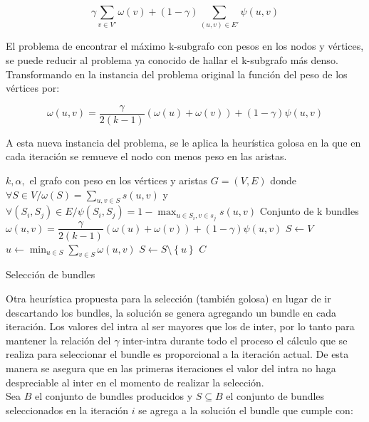 \begin{equation}
\gamma \sum_{v \in V'}{\omega(v)} + (1 - \gamma) \sum_{(u,v) \in E'}{\psi(u,v)}
\end{equation}

El problema de encontrar el máximo k-subgrafo con pesos en los nodos y vértices, se puede reducir al problema ya conocido de hallar el k-subgrafo más denso\cite{SubgraphProblem}. Transformando en la instancia del problema original la función del peso de los vértices por:
 
\begin{equation}
\omega(u,v) = \dfrac{\gamma}{2( k - 1)} (\omega(u) + \omega(v)) + (1 - \gamma)\psi(u,v) 
\end{equation}

A esta nueva instancia del problema, se le aplica la heurística golosa en la que en cada iteración se remueve el nodo con menos peso en las aristas.\\

\begin{algorithm}[H]
\begin{algorithmic}[1]
\REQUIRE $k, \alpha,$ el grafo con peso en los vértices y aristas  $G=(V,E)$ donde $\forall S \in V / \omega(S) = \sum_{u,v \in S}{s(u,v)}$ y $\forall (S_i,S_j) \in E / \psi(S_i,S_j) = 1 - \max_{u \in S_i, v \in s_j}{s(u,v)}$
\ENSURE Conjunto de k bundles
\STATE $\omega(u,v) = \dfrac{\gamma}{2( k - 1)} (\omega(u) + \omega(v)) + (1 - \gamma)\psi(u,v)$
\STATE $S \leftarrow V$
\STATE $u \leftarrow \min_{u \in S}{\sum_{v \in S}{\omega(u,v)}}$
\STATE $S \leftarrow S \setminus  \left\{u\right\} $
\ENDWHILE
\RETURN $C$
\end{algorithmic}
\caption{Selección de bundles}\label{alg:chooseBundles}
\end{algorithm}

Otra heurística propuesta para la selección (también golosa) en lugar de ir descartando los bundles, la solución se genera agregando un bundle en cada iteración. Los valores del intra al ser mayores que los de inter, por lo tanto para mantener la relación del $\gamma$ inter-intra durante todo el proceso el cálculo que se realiza para seleccionar el bundle es proporcional a la iteración actual. De esta manera se asegura que en las primeras iteraciones el valor del intra no haga despreciable al inter en el momento de realizar la selección.\\
Sea $B$ el conjunto de bundles producidos y $S \subseteq B$ el conjunto de bundles seleccionados en la iteración $i$ se agrega a la solución el bundle que cumple con:

